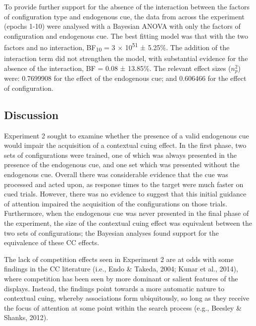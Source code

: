 \documentclass[
  man,
  floatsintext,
  longtable,
  nolmodern,
  notxfonts,
  notimes,
  colorlinks=true,linkcolor=blue,citecolor=blue,urlcolor=blue]{apa7}
\begin{document}
To provide further support for the absence of the interaction between
the factors of configuration type and endogenous cue, the data from
across the experiment (epochs 1-10) were analysed with a Bayesian ANOVA
with only the factors of configuration and endogenous cue. The best
fitting model was that with the two factors and no interaction,
BF\textsubscript{10} = 3 × 10\textsuperscript{51} ± 5.25\%. The addition
of the interaction term did not strengthen the model, with substantial
evidence for the absence of the interaction, BF = 0.08 ± 13.85\%. The
relevant effect sizes (\(n^2_p\)) were: 0.7699908 for the effect of the
endogenous cue; and 0.606466 for the effect of configuration.

\subsection{Discussion}\label{discussion-1}

Experiment 2 sought to examine whether the presence of a valid
endogenous cue would impair the acquisition of a contextual cuing
effect. In the first phase, two sets of configurations were trained, one
of which was always presented in the presence of the endogenous cue, and
one set which was presented without the endogenous cue. Overall there
was considerable evidence that the cue was processed and acted upon, as
response times to the target were much faster on cued trials. However,
there was no evidence to suggest that this initial guidance of attention
impaired the acquisition of the configurations on those trials.
Furthermore, when the endogenous cue was never presented in the final
phase of the experiment, the size of the contextual cuing effect was
equivalent between the two sets of configurations; the Bayesian analyses
found support for the equivalence of these CC effects.

The lack of competition effects seen in Experiment 2 are at odds with
some findings in the CC literature (i.e., Endo \& Takeda, 2004; Kunar et
al., 2014), where competition has been seen by more dominant or salient
features of the displays. Instead, the findings point towards a more
automatic nature to contextual cuing, whereby associations form
ubiquitously, so long as they receive the focus of attention at some
point within the search process (e.g., Beesley \& Shanks, 2012).
\end{document}

